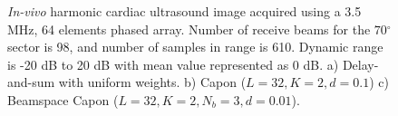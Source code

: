 \documentclass[12pt,journal,onecolumn]{IEEEtran}
\newcommand{\degree}{\ensuremath{^\circ}}
\begin{document}
\begin{figure}[!t]
\centerline{
\hfil
{}
\hfil
{}}
\caption{\textit{In-vivo} harmonic cardiac ultrasound image acquired using a 3.5 MHz, 64 elements phased array. Number of receive beams for the $70\degree$ sector is 98, and number of samples in range is 610. Dynamic range is -20 dB to 20 dB with mean value represented as 0 dB. a) Delay-and-sum with uniform weights. b) Capon ($L=32, K=2, d=0.1$) c) Beamspace Capon ($L=32, K=2, N_b=3, d=0.01$).}
\label{fig:invivo}
\end{figure}
\end{document}
